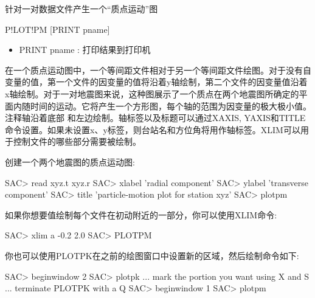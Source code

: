 \label{cmd:plotpm}

针对一对数据文件产生一个``质点运动''图

\begin{SACSTX}
P!LOT!PM [PRINT pname]
\end{SACSTX}

\begin{itemize}
\item PRINT pname : 打印结果到打印机
\end{itemize}

在一个质点运动图中，一个等间距文件相对于另一个等间距文件绘图。对于没有自变量的值，第一个文件的因变量的值将沿着y轴绘制，第二个文件的因变量值沿着x轴绘制。对于一对地震图来说，这种图展示了一个质点在两个地震图所确定的平面内随时间的运动。它将产生一个方形图，每个轴的范围为因变量的极大极小值。注释轴沿着底部	和左边绘制。轴标签以及标题可以通过XAXIS, YAXIS和TITLE命令设置。如果未设置x、y标签，则台站名和方位角将用作轴标签。XLIM可以用于控制文件的哪些部分需要被绘制。

创建一个两个地震图的质点运动图:
\begin{SACCode}
SAC> read xyz.t xyz.r
SAC> xlabel 'radial component'
SAC> ylabel 'transverse component'
SAC> title 'particle-motion plot for station xyz'
SAC> plotpm
\end{SACCode}

如果你想要值绘制每个文件在初动附近的一部分，你可以使用XLIM命令:
\begin{SACCode}
SAC> xlim a -0.2 2.0
SAC> PLOTPM
\end{SACCode}

你也可以使用PLOTPK在之前的绘图窗口中设置新的区域，然后绘制命令如下:
\begin{SACCode}
SAC> beginwindow 2
SAC> plotpk
 ... mark the portion you want using X and S
 ... terminate PLOTPK with a Q
SAC> beginwindow 1
SAC> plotpm
\end{SACCode}
